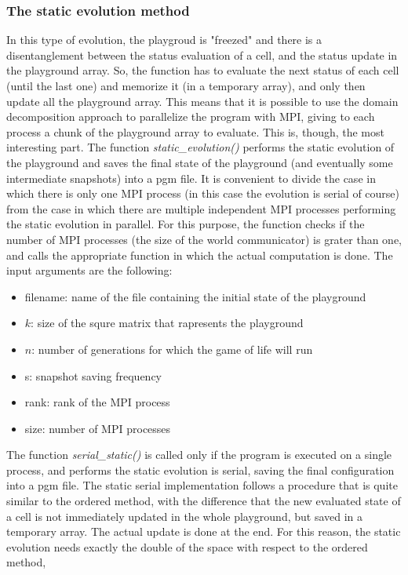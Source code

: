 \documentclass[12pt, titlepage]{report}
\begin{document}
\subsubsection{The static evolution method}
In this type of evolution, the playgroud is "freezed" and there is a disentanglement between the status evaluation of a cell, and the status update in the 
playground array. So, the function has to evaluate the next status of each cell (until the last one) and memorize it (in a temporary array), 
and only then update all the playground array. This means that it is possible to use the domain decomposition approach to parallelize the program with MPI,
giving to each process a chunk of the playground array to evaluate. This is, though, the most interesting part.
The function \emph{static\_evolution()} performs the static evolution of the playground and saves the final state of the playground (and eventually some intermediate snapshots) into a pgm file. 
It is convenient to divide the case in which there is only one MPI process (in this case the evolution is serial of course) from the case in which 
there are multiple independent MPI processes performing the static evolution in parallel.
For this purpose, the function checks if the number of MPI processes (the size of the world communicator) is grater than one, 
and calls the appropriate function in which the actual computation is done. The input arguments are the following:
\begin{itemize}
	\item filename: name of the file containing the initial state of the playground
	\item $k$: size of the squre matrix that rapresents the playground
	\item $n$: number of generations for which the game of life will run
	\item s: snapshot saving frequency
	\item rank: rank of the MPI process
	\item size: number of MPI processes
\end{itemize}
The function \emph{serial\_static()} is called only if the program is executed on a single process, and performs the static evolution is serial, 
saving the final configuration into a pgm file. The static serial implementation follows a procedure that is quite similar to the ordered method, 
with the difference that the new evaluated state of a cell is not immediately updated in the whole playground, but saved in a temporary array. The 
actual update is done at the end. For this reason, the static evolution needs exactly the double of the space with respect to the ordered method, 
\end{document}
